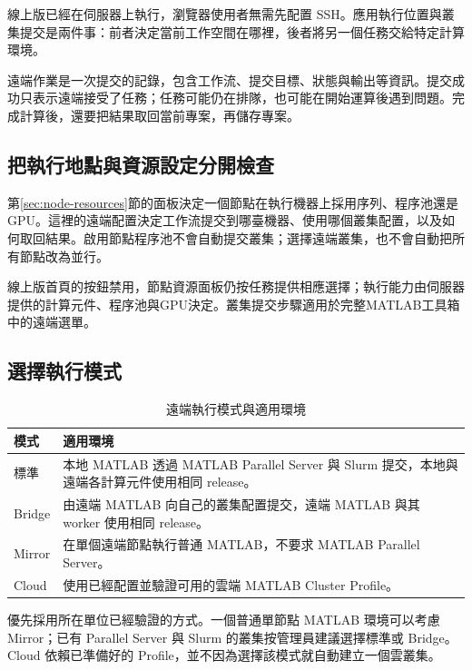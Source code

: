 線上版已經在伺服器上執行，瀏覽器使用者無需先配置 SSH。應用執行位置與叢集提交是兩件事：前者決定當前工作空間在哪裡，後者將另一個任務交給特定計算環境。

遠端作業是一次提交的記錄，包含工作流、提交目標、狀態與輸出等資訊。提交成功只表示遠端接受了任務；任務可能仍在排隊，也可能在開始運算後遇到問題。完成計算後，還要把結果取回當前專案，再儲存專案。

\subsection{把執行地點與資源設定分開檢查}

第\ref{sec:node-resources}節的面板決定一個節點在執行機器上採用序列、程序池還是GPU。這裡的遠端配置決定工作流提交到哪臺機器、使用哪個叢集配置，以及如何取回結果。啟用節點程序池不會自動提交叢集；選擇遠端叢集，也不會自動把所有節點改為並行。

線上版首頁的按鈕禁用，節點資源面板仍按任務提供相應選擇；執行能力由伺服器提供的計算元件、程序池與GPU決定。叢集提交步驟適用於完整MATLAB\regmark{}工具箱中的遠端選單。

\subsection{選擇執行模式}

\begin{table}[htbp]
\centering
\caption{遠端執行模式與適用環境}
\begin{tabularx}{\linewidth}{lX}
\toprule
模式 & 適用環境 \\
\midrule
標準 & 本地 MATLAB\regmark{} 透過 MATLAB\regmark{} Parallel Server 與 Slurm 提交，本地與遠端各計算元件使用相同 release。\\
Bridge & 由遠端 MATLAB\regmark{} 向自己的叢集配置提交，遠端 MATLAB\regmark{} 與其 worker 使用相同 release。\\
Mirror & 在單個遠端節點執行普通 MATLAB\regmark{}，不要求 MATLAB\regmark{} Parallel Server。\\
Cloud & 使用已經配置並驗證可用的雲端 MATLAB\regmark{} Cluster Profile。\\
\bottomrule
\end{tabularx}
\end{table}

優先採用所在單位已經驗證的方式。一個普通單節點 MATLAB\regmark{} 環境可以考慮 Mirror；已有 Parallel Server 與 Slurm 的叢集按管理員建議選擇標準或 Bridge。Cloud 依賴已準備好的 Profile，並不因為選擇該模式就自動建立一個雲叢集。

